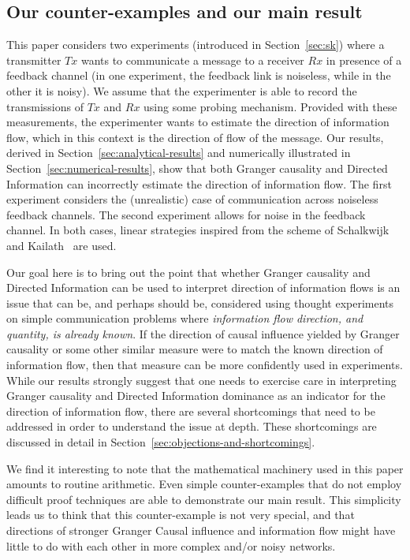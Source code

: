 \documentclass[letterpaper, 10pt, conference]{ieeeconf}
\begin{document}
\subsection{Our counter-examples and our main result}
\label{sec:our-counterexamples}

This paper considers two experiments (introduced in Section~\ref{sec:sk}) where a transmitter $Tx$ wants to communicate a message to a receiver $Rx$ in presence of a feedback channel (in one experiment, the feedback link is noiseless, while in the other it is noisy). We assume that the experimenter is able to record the transmissions of $Tx$ and $Rx$ using some probing mechanism. Provided with these measurements, the experimenter wants to estimate the direction of information flow, which in this context is the direction of flow of the message. Our results, derived in Section~\ref{sec:analytical-results} and numerically illustrated in Section~\ref{sec:numerical-results}, show that both Granger causality and Directed Information can incorrectly estimate the direction of information flow. The first experiment considers the (unrealistic) case of communication across noiseless feedback channels. The second experiment allows for noise in the feedback channel. In both cases, linear strategies inspired from the scheme of Schalkwijk and Kailath~\cite{S&K} are used.

Our goal here is to bring out the point that whether Granger causality and Directed Information can be used to interpret direction of information flows is an issue that can be, and perhaps should be, considered using thought experiments on simple communication problems where \emph{information flow direction, and quantity, is already known}. If the direction of causal influence yielded by Granger causality or some other similar measure were to match the known direction of information flow, then that measure can be more confidently used in experiments. While our results strongly suggest that one needs to exercise care in interpreting Granger causality and Directed Information dominance as an indicator for the direction of information flow, there are several shortcomings that need to be addressed in order to understand the issue at depth. These shortcomings are discussed in detail in Section~\ref{sec:objections-and-shortcomings}.

We find it interesting to note that the mathematical machinery used in this paper amounts to routine arithmetic. Even simple counter-examples that do not employ difficult proof techniques are able to demonstrate our main result. This simplicity leads us to think that this counter-example is not very special, and that directions of stronger Granger Causal influence and information flow might have little to do with each other in more complex and/or noisy networks.
\end{document}
